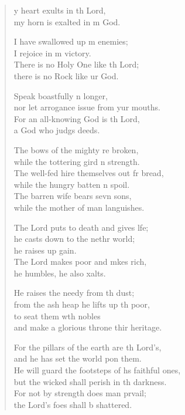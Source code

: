 \settowidth{\versewidth}{He will guard the footsteps of his faithful ones, *}
\begin{verse}%
  \begin{patverse}
    y heart exults in th Lord,\Med\\
my horn is exalted in m God.

I have swallowed up m enemies;\Med\\
I rejoice in m victory.\\
There is no Holy One like th Lord;\Med\\
there is no Rock like ur God.

Speak boastfully n longer,\Med\\
nor let arrogance issue from yur mouths.\\
For an all-knowing God is th Lord,\Med\\
a God who judgs deeds.

The bows of the mighty re broken,\Med\\
while the tottering gird n strength.\\
The well-fed hire themselves out fr bread,\Med\\
while the hungry batten n spoil.\\
The barren wife bears sevn sons,\Med\\
while the mother of man languishes.

The Lord puts to death and gives l\pointup{\i}fe;\Flex\\
he casts down to the nethr world;\Med\\
he raises up gain.\\
The Lord makes poor and mkes rich,\Med\\
he humbles, he also xalts.

He raises the needy from th dust;\Med\\
from the ash heap he lifts up th poor,\\
to seat them w\pointup{\i}th nobles\Med\\
and make a glorious throne thir heritage.

For the pillars of the earth are th Lord’s,\Med\\
and he has set the world pon them.\\
He will guard the footsteps of h\pointup{\i}s faithful ones,\Med\\
but the wicked shall perish in th darkness.\\
For not by strength does man prvail;\Med\\
the Lord’s foes shall b shattered.


\end{patverse}
\end{verse}
